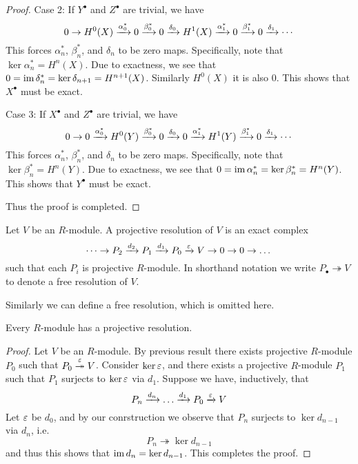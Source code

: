 \begin{proof}
    Case 2: If $Y^\bullet$ and $Z^\bullet$ are trivial, we have
    \[0 \to H^0(X) \xrightarrow{\alpha^*_0} 0 \xrightarrow{\beta^*_0} 0 \xrightarrow{\delta_0} H^1(X) \xrightarrow{\alpha^*_1} 0 \xrightarrow{\beta^*_1} 0 \xrightarrow{\delta_1} \cdots\]
    This forces $\alpha_n^*$, $\beta_n^*$, and $\delta_n$ to be zero maps. Specifically, note that $\ker \alpha_n^* = H^n (X)$. Due to exactness, we see that $0 = \operatorname{im} \delta_n^* = \ker \delta_{n+1} = H^{n+1} (X)$. Similarly $H^0(X)$ it is also $0$. This shows that $X^\bullet$ must be exact.

    Case 3: If $X^\bullet$ and $Z^\bullet$ are trivial, we have
    \[0 \to 0 \xrightarrow{\alpha^*_0} H^0(Y) \xrightarrow{\beta^*_0} 0 \xrightarrow{\delta_0} 0 \xrightarrow{\alpha^*_1} H^1(Y) \xrightarrow{\beta^*_1} 0 \xrightarrow{\delta_1} \cdots\]
    This forces $\alpha_n^*$, $\beta_n^*$, and $\delta_n$ to be zero maps. Specifically, note that $\ker \beta_n^* = H^n (Y)$. Due to exactness, we see that $0 = \operatorname{im} \alpha_n^* = \ker \beta_{n}^* = H^{n} (Y)$. This shows that $Y^\bullet$ must be exact.

    Thus the proof is completed.
\end{proof}

\begin{defn} 
    Let $V$ be an $R$-module. A projective resolution of $V$ is an exact complex 
    \[\cdots \to P_2 \xrightarrow{d_2} P_1 \xrightarrow{d_1} P_0 \xrightarrow{\varepsilon} V \to 0\to 0 \to \dots\]
    such that each $P_i$ is projective $R$-module. In shorthand notation we write $P_\bullet \twoheadrightarrow V$ to denote a free resolution of $V$.
\end{defn}
 
\medskip

\begin{re}
    Similarly we can define a free resolution, which is omitted here.
\end{re}

\medskip

\begin{pro}
    Every $R$-module has a projective resolution.
\end{pro}
\begin{proof}
    Let $V$ be an $R$-module. By previous result there exists projective $R$-module $P_0$ such that $P_0 \overset{\varepsilon}{\twoheadrightarrow} V$. Consider $\ker \varepsilon$, and there exists a projective $R$-module $P_1$ such that $P_1$ surjects to $\ker \varepsilon$ via $d_1$. Suppose we have, inductively, that 
    \[P_n \xrightarrow{d_n} \dots \xrightarrow{d_1} P_0 \xrightarrow{\varepsilon} V\]
    Let $\varepsilon$ be $d_0$, and by our conrstruction we observe that $P_n$ surjects to $\ker d_{n-1}$ via $d_n$, i.e.
    \[P_n \twoheadrightarrow \ker d_{n-1}\]
    and thus this shows that $\operatorname{im} d_{n} = \ker d_{n-1}$. This completes the proof.
\end{proof}

